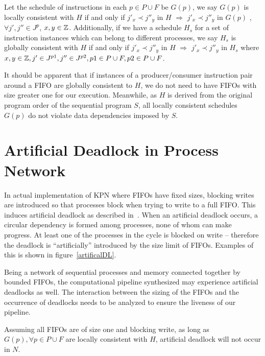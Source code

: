 \begin{definition}
Let the schedule of instructions in each $p \in P \cup F$ be $G(p)$, we say $G(p)$ is locally consistent with $H$ if
and only if
$j'_x \prec j''_y$ in $H$ $\Rightarrow$ $j'_x \prec j''_y$ in $G(p)$
, $\forall j', j'' \in J^p$, 
$x, y \in \Bbb{Z}$. Additionally, if we have a schedule $H_s$ for a set of instruction instances  which can belong to different processes, we say $H_s$ is globally consistent with
$H$ if and only if $j'_x \prec j''_y$ in $H$ $\Rightarrow$ $j'_x \prec j''_y$ in $H_s$
 where  $x,y \in \Bbb{Z}, j' \in J^{p1}, j'' \in J^{p2}, p1 \in P \cup F, p2 \in P \cup F$.
\end{definition}


It should be apparent that if instances of a producer/consumer
instruction pair around a FIFO are globally consistent to $H$, we
do not need to have FIFOs with size greater one for our execution.
Meanwhile, as $H$ is derived from the original program order of
the sequential program $S$, all locally consistent schedules $G(p)$ 
do not violate data dependencies imposed by $S$.


\section{Artificial Deadlock in Process Network}
In actual implementation of KPN where FIFOs have fixed sizes, blocking
writes are introduced so that processes block when trying to write to a full FIFO.
This induces artificial deadlock as described in~\cite{}. 
When an artificial deadlock occurs, a circular dependency is formed among
processes, none of whom can make progress. At least one of the processes
in the cycle is blocked on write -- therefore the deadlock is ``artificially''
introduced by the size limit of FIFOs. Examples of this is shown in figure~\ref{artificalDL}. 



Being a network of sequential processes and memory connected together by
bounded FIFOs, the computational pipeline synthesized may experience
artificial deadlocks as well. The interaction between the sizing of the FIFOs 
and the occurrence of deadlocks needs to be analyzed to ensure the liveness
of our pipeline.

\begin{lemma}
\label{nondeadlock}
Assuming 
all FIFOs are of size one and blocking write,
as long as $G(p), \forall p \in P \cup F$ are locally consistent with $H$,
artificial deadlock will not occur in $N$. 
\end{lemma}

